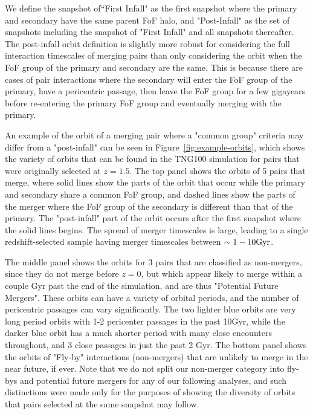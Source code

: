 \documentclass[twocolumn,linenumbers]{aastex631}
\begin{document}
We define the snapshot of``First Infall" as the first snapshot where the primary and secondary have the same parent FoF halo, and "Post-Infall" as the set of snapshots including the snapshot of "First Infall" and all snapshots thereafter. 
The post-infall orbit definition is slightly more robust for considering the full interaction timescales of merging pairs than only considering the orbit when the FoF group of the primary and secondary are the same. 
This is because there are cases of pair interactions where the secondary will enter the FoF group of the primary, have a pericentric passage, then leave the FoF group for a few gigayears before re-entering the primary FoF group and eventually merging with the primary. 

An example of the orbit of a merging pair where a "common group" criteria may differ from a "post-infall" can be seen in Figure~\ref{fig:example-orbits}, which shows the variety of orbits that can be found in the TNG100 simulation for pairs that were originally selected at $z=1.5$. 
The top panel shows the orbits of 5 pairs that merge, where solid lines show the parts of the orbit that occur while the primary and secondary share a common FoF group, and dashed lines show the parts of the merger where the FoF group of the secondary is different than that of the primary. 
The "post-infall" part of the orbit occurs after the first snapshot where the solid lines begins.
The spread of merger timescales is large, leading to a single redshift-selected sample having merger timescales between $\sim1-10\mathrm{Gyr}$.


The middle panel shows the orbits for 3 pairs that are classified as non-mergers, since they do not merge before $z=0$, but which appear likely to merge within a couple Gyr past the end of the simulation, and are thus "Potential Future Mergers". 
These orbits can have a variety of orbital periods, and the number of pericentric passages can vary significantly. 
The two lighter blue orbits are very long period orbits with 1-2 pericenter passages in the past 10Gyr, while the darker blue orbit has a much shorter period with many close encounters throughout, and 3 close passages in just the past 2 Gyr.
The bottom panel shows the orbits of "Fly-by" interactions (non-mergers) that are unlikely to merge in the near future, if ever.  
Note that we do not split our non-merger category into fly-bys and potential future mergers for any of our following analyses, and such distinctions were made only for the purposes of showing the diversity of orbits that pairs selected at the same snapshot may follow.
\end{document}
